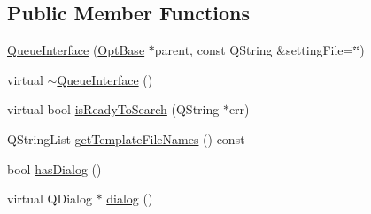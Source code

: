 \subsection*{Public Member Functions}
\begin{DoxyCompactItemize}
\item 
\hyperlink{classGlobalSearch_1_1QueueInterface_a77760aeacabb67669a1a32cf3355d472}{Queue\+Interface} (\hyperlink{classGlobalSearch_1_1OptBase}{Opt\+Base} $\ast$parent, const Q\+String \&setting\+File=\char`\"{}\char`\"{})
\item 
virtual \hyperlink{classGlobalSearch_1_1QueueInterface_a3e27228ce5719de17a5fabe8c105d174}{$\sim$\+Queue\+Interface} ()
\item 
virtual bool \hyperlink{classGlobalSearch_1_1QueueInterface_a5da91bc3cd0c30e9a3c7259aada7b5f9}{is\+Ready\+To\+Search} (Q\+String $\ast$err)
\item 
Q\+String\+List \hyperlink{classGlobalSearch_1_1QueueInterface_a1208dba4232727cc026efdf7423f29ad}{get\+Template\+File\+Names} () const 
\item 
bool \hyperlink{group__dialog_gaa78e95fa76777efba3cdfd70d8e3caf9}{has\+Dialog} ()
\item 
virtual Q\+Dialog $\ast$ \hyperlink{group__dialog_ga4457d66b93f0406af1b595659ca25dcf}{dialog} ()
\end{DoxyCompactItemize}
